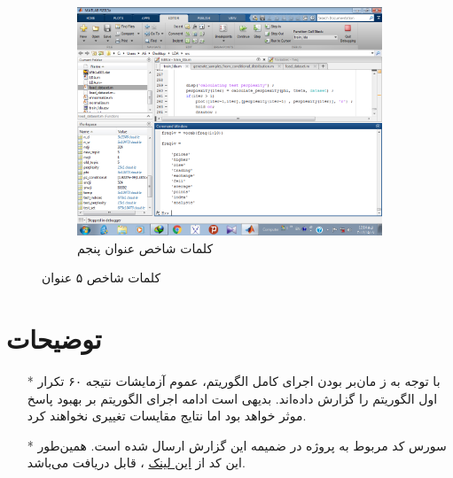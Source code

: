 \documentclass[11.5pt,a4paper]{article}
\begin{document}
\begin{figure}[h]
\begin{subfigure}{.45\textwidth}
		\includegraphics[scale=0.25]{Imgs/freqk5.png}
		\caption{کلمات شاخص عنوان پنجم}
	\end{subfigure}
\caption{کلمات شاخص ۵ عنوان
}
\label{fig:wordcluster}
\end{figure} 



\vfill
\section{توضیحات}
\begin{itemize}
\item [*] با توجه به ز مان‌بر بودن اجرای کامل الگوریتم، عموم آزمایشات نتیجه ۶۰ تکرار اول الگوریتم  را گزارش داده‌اند. بدیهی  است ادامه اجرای الگوریتم بر بهبود پاسخ موثر خواهد بود اما نتایج مقایسات تغییری نخواهند کرد. 
\item [*] سورس کد مربوط به پروژه در ضمیمه این گزارش ارسال شده است. همین‌طور این کد از
\href{https://github.com/ahmad-asadi/PGM/tree/master/LDA}
{این لینک}
، قابل 
دریافت می‌باشد.
\end{itemize}
\end{document}
